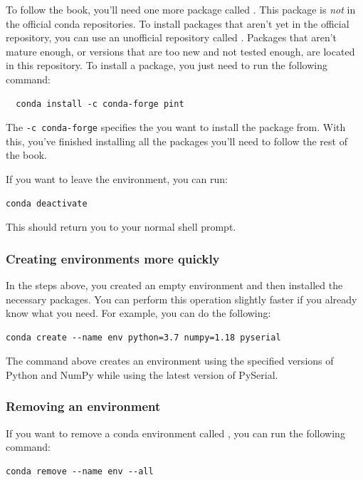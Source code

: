 To follow the book, you'll need one more package called . This package is \emph{not} in the official conda repositories. To install packages that aren't yet in the official repository, you can use an unofficial repository called . Packages that aren't mature enough, or versions that are too new and not tested enough, are located in this repository. To install a package, you just need to run the following command:

\begin{verbatim}
  conda install -c conda-forge pint
\end{verbatim}

The \texttt{-c conda-forge} specifies the  you want to install the package from. With this, you've finished installing all the packages you'll need to follow the rest of the book.

If you want to leave the environment, you can run:

\begin{verbatim}
conda deactivate
\end{verbatim}

This should return you to your normal shell prompt.

\subsubsection{Creating environments more quickly}
In the steps above, you created an empty environment and then installed the necessary packages. You can perform this operation slightly faster if you already know what you need. For example, you can do the following:

\begin{verbatim}
conda create --name env python=3.7 numpy=1.18 pyserial
\end{verbatim}

The command above creates an environment using the specified versions of Python and NumPy while using the latest version of PySerial.

\subsubsection{Removing an environment}
If you want to remove a conda environment called , you can run the following command:

\begin{verbatim}
conda remove --name env --all
\end{verbatim}

